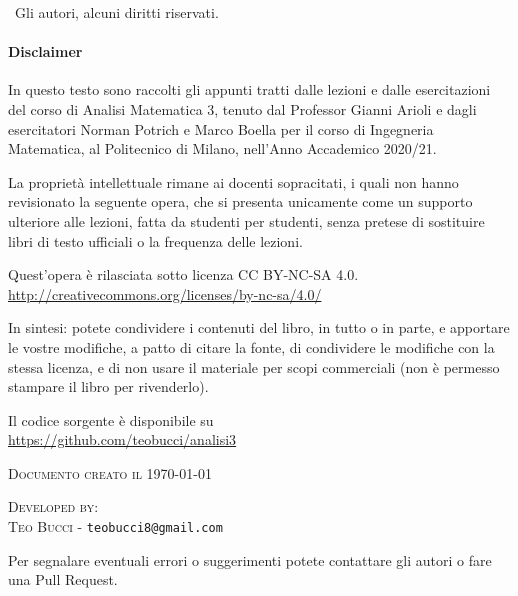 
\textcopyright \ Gli autori, alcuni diritti riservati.

\paragraph{Disclaimer} In questo testo sono raccolti gli appunti tratti dalle lezioni e dalle esercitazioni del corso di Analisi Matematica 3, tenuto dal Professor Gianni Arioli e dagli esercitatori Norman Potrich e Marco Boella per il corso di Ingegneria Matematica, al Politecnico di Milano, nell'Anno Accademico 2020/21.

La proprietà intellettuale rimane ai docenti sopracitati, i quali non hanno revisionato la seguente opera, che si presenta unicamente come un supporto ulteriore alle lezioni, fatta da studenti per studenti, senza pretese di sostituire libri di testo ufficiali o la frequenza delle lezioni.

Quest'opera è rilasciata sotto licenza CC BY-NC-SA 4.0.\\
\url{http://creativecommons.org/licenses/by-nc-sa/4.0/}

In sintesi: potete condividere i contenuti del libro, in tutto o in parte, e apportare le vostre modifiche, a patto di citare la fonte, di condividere le modifiche con la stessa licenza, e di non usare il materiale per scopi commerciali (non è permesso stampare il libro per rivenderlo).

Il codice sorgente \latex è disponibile su \\
\url{https://github.com/teobucci/analisi3}


\textsc{Documento creato il \today}


\textsc{Developed by:}\\
\textsc{Teo Bucci} - \texttt{teobucci8@gmail.com}

Per segnalare eventuali errori o suggerimenti potete contattare gli autori o fare una Pull Request.


